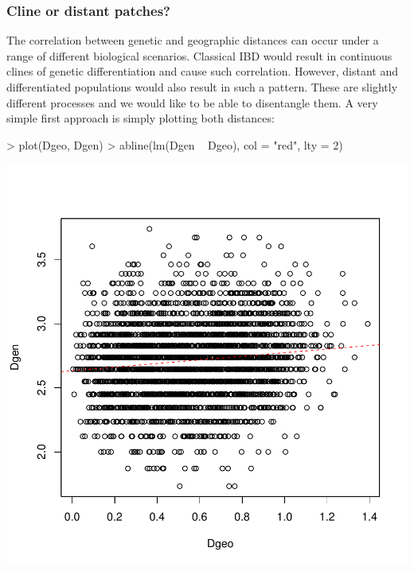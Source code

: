 \documentclass{article}
\begin{document}
\subsubsection{Cline or distant patches?}
The correlation between genetic and geographic distances can occur under a range of different
biological scenarios.
Classical IBD would result in continuous clines of genetic differentiation and cause such correlation.
However, distant and differentiated populations would also result in such a pattern.
These are slightly different processes and we would like to be able to disentangle them.
A very simple first approach is simply plotting both distances:
\begin{Schunk}
\begin{Sinput}
> plot(Dgeo, Dgen)
> abline(lm(Dgen ~ Dgeo), col = "red", lty = 2)
\end{Sinput}
\end{Schunk}
\includegraphics{figs/base-083}
\end{document}

